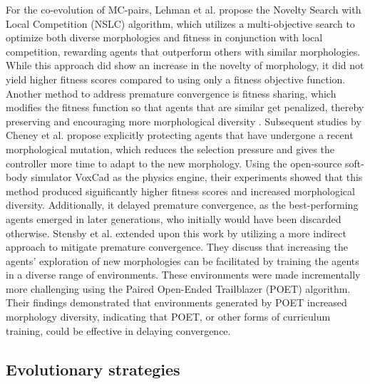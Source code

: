         For the co-evolution of MC-pairs, Lehman et al. \cite{Lehman_2011} propose the Novelty Search with Local Competition (NSLC) algorithm, which utilizes a multi-objective search to optimize both diverse morphologies and fitness in conjunction with local competition, rewarding agents that outperform others with similar morphologies. While this approach did show an increase in the novelty of morphology, it did not yield higher fitness scores compared to using only a fitness objective function. Another method to address premature convergence is fitness sharing, which modifies the fitness function so that agents that are similar get penalized, thereby preserving and encouraging more morphological diversity \cite{McKay_2000}. Subsequent studies by Cheney et al. \cite{Cheney_2017} propose explicitly protecting agents that have undergone a recent morphological mutation, which reduces the selection pressure and gives the controller more time to adapt to the new morphology. Using the open-source soft-body simulator VoxCad as the physics engine, their experiments showed that this method produced significantly higher fitness scores and increased morphological diversity. Additionally, it delayed premature convergence, as the best-performing agents emerged in later generations, who initially would have been discarded otherwise. Stensby et al. \cite{Emma_Stensby_2021} extended upon this work by utilizing a more indirect approach to mitigate premature convergence. They discuss that increasing the agents' exploration of new morphologies can be facilitated by training the agents in a diverse range of environments. These environments were made incrementally more challenging using the Paired Open-Ended Trailblazer (POET) algorithm. Their findings demonstrated that environments generated by POET increased morphology diversity, indicating that POET, or other forms of curriculum training, could be effective in delaying convergence.

\subsection{Evolutionary strategies}
